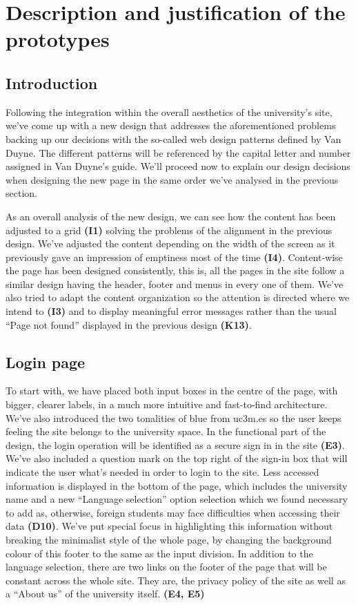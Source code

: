 \documentclass{article}
\begin{document}
\newpage



\section{Description and justification	of the prototypes}
\subsection{Introduction}
Following the integration within the overall aesthetics of the university’s site, we’ve come up with a new design that addresses the aforementioned problems backing up our decisions with the so-called web design patterns defined by Van Duyne. The different patterns will be referenced by the capital letter and number assigned in Van Duyne’s guide.
We’ll proceed now to explain our design decisions when designing the new page in the same order we’ve analysed in the previous section.

As an overall analysis of the new design, we can see how the content has been adjusted to a grid \textbf{(I1)} solving the problems of the alignment in the previous design. We’ve adjusted the content depending on the width of the screen as it previously gave an impression of emptiness most of the time \textbf{(I4)}. Content-wise the page has been designed consistently, this is, all the pages in the site follow a similar design having the header, footer and menus in every one of them. We’ve also tried to adapt the content organization so the attention is directed where we intend to \textbf{(I3)} and to display meaningful error messages rather than the usual “Page not found” displayed in the previous design \textbf{(K13)}.

\subsection{Login page}

To start with, we have placed both input boxes in the centre of the page, with bigger, clearer labels, in a much more intuitive and fast-to-find architecture. We’ve also introduced the two tonalities of blue from uc3m.es so the user keeps feeling the site belongs to the university space. In the functional part of the design, the login operation will be identified as a secure sign in in the site \textbf{(E3)}. We’ve also included a question mark on the top right of the sign-in box that will indicate the user what’s needed in order to login to the site.
Less accessed information is displayed in the bottom of the page, which includes the university name and a new “Language selection” option selection which we found necessary to add as, otherwise, foreign students may face difficulties when accessing their data \textbf{(D10)}. We’ve put special focus in highlighting this information without breaking the minimalist style of the whole page, by changing the background colour of this footer to the same as the input division. In addition to the language selection, there are two links on the footer of the page that will be constant across the whole site. They are, the privacy policy of the site as well as a “About us” of the university itself. \textbf{(E4, E5)}
\end{document}

